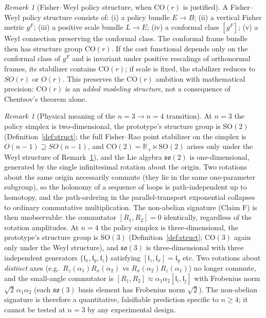 \documentclass[11pt,a4paper]{article}
\theoremstyle{plain}
\theoremstyle{definition}
\theoremstyle{remark}
\newtheorem{remark}[theorem]{Remark}
\newcommand{\RR}{\mathbb{R}}
\newcommand{\SO}{\mathrm{SO}}
\newcommand{\CO}{\mathrm{CO}}
\newcommand{\so}{\mathfrak{so}}
\begin{document}
\begin{remark}[Fisher--Weyl policy structure, when $\CO(r)$ is justified]
\label{rem:fisher-weyl}
A Fisher--Weyl policy structure consists of: (i) a policy bundle
$E\to B$; (ii) a vertical Fisher metric $g^F$; (iii) a positive scale
bundle $L\to E$; (iv) a conformal class $[g^F]$; (v) a Weyl connection
preserving the conformal class. The conformal frame bundle then has
structure group $\CO(r)$. If the cost functional depends only on the
conformal class of $g^F$ and is invariant under positive rescalings of
orthonormal frames, its stabilizer contains $\CO(r)$; if scale is
fixed, the stabilizer reduces to $SO(r)$ or $O(r)$. This preserves the $\CO(r)$ ambition with mathematical precision: $\CO(r)$ is an
\emph{added modeling structure}, not a consequence of Chentsov's
theorem alone.
\end{remark}

\begin{remark}[Physical meaning of the $n=3\to n=4$ transition]
\label{rem:n3-n4}
At $n=3$ the policy simplex is two-dimensional, the prototype's
structure group is $\SO(2)$
(Definition~\ref{def:struct}; the full Fisher--Rao point stabilizer
on the simplex is $O(n-1)\supseteq SO(n-1)$, and $\CO(2)=\RR_+
\ltimes\SO(2)$ arises only under the Weyl structure of
Remark~\ref{rem:fisher-weyl}), and the Lie algebra
$\so(2)$ is one-dimensional, generated by the single infinitesimal
rotation about the origin. Two rotations about the same origin
necessarily commute (they lie in the same one-parameter subgroup), so
the holonomy of a sequence of loops is path-independent up to
homotopy, and the path-ordering in the parallel-transport exponential
collapses to ordinary commutative multiplication. The non-abelian
signature (Claim F) is then unobservable: the commutator
$[R_1,R_2]=0$ identically, regardless of the rotation amplitudes.
At $n=4$ the policy simplex is three-dimensional, the prototype's
structure group is $\SO(3)$ (Definition~\ref{def:struct}; $\CO(3)$
again only under the Weyl structure), and $\so(3)$ is
three-dimensional with
three independent generators $\{\mathfrak{l}_x,\mathfrak{l}_y,
\mathfrak{l}_z\}$ satisfying $[\mathfrak{l}_z,\mathfrak{l}_x]
=\mathfrak{l}_y$ etc. Two rotations about \emph{distinct} axes (e.g.\
$R_z(\alpha_1)R_x(\alpha_2)$ vs $R_x(\alpha_2)R_z(\alpha_1)$) no
longer commute, and the small-angle commutator is
$[R_1,R_2]\approx\alpha_1\alpha_2[\mathfrak{l}_i,\mathfrak{l}_j]$
with Frobenius norm $\sqrt{2}\,\alpha_1\alpha_2$ (each
$\so(3)$ basis element has Frobenius norm $\sqrt{2}$). The
non-abelian signature is therefore a quantitative, falsifiable
prediction specific to $n\geq 4$; it cannot be tested at $n=3$ by any
experimental design.
\end{remark}
\end{document}
